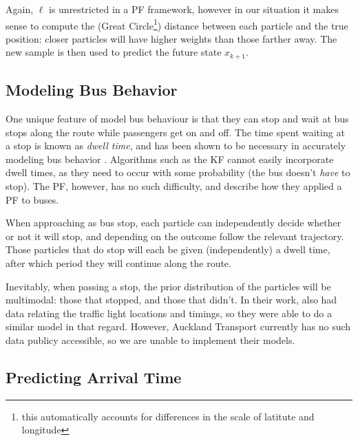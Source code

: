 \documentclass[12pt,a4paper]{article}
\begin{document}
Again, $\ell$ is unrestricted in a PF framework, however in our situation it makes sense to 
compute the (Great Circle\footnote{this automatically accounts for differences in the scale of latitute
and longitude}) 
distance between each particle and the true position:
closer particles will have higher weights than those farther away.
The new sample is then used to predict the future state $x_{k+1}$.





\subsection{Modeling Bus Behavior}
\label{sec:busbehavior}


One unique feature of model bus behaviour is that they can stop and wait at bus stops along the route
while passengers get on and off.
The time spent waiting at a stop is known as \emph{dwell time},
and has been shown to be necessary in accurately modeling bus behavior \citep{cn}.
Algorithms such as the KF cannot easily incorporate dwell times,
as they need to occur with some probability (the bus doesn't \emph{have} to stop).
The PF, however, has no such difficulty,
and \cite{hans-etal:2015} describe how they applied a PF to buses.


When approaching as bus stop,
each particle can independently decide whether or not it will stop,
and depending on the outcome follow the relevant trajectory.
Those particles that do stop will each be given (independently)
a dwell time, after which period they will continue along the route.

Inevitably, when passing a stop, the prior distribution of the particles will be multimodal:
those that stopped, and those that didn't.
In their work, \cite{hans-etal:2015} also had data relating the traffic light locations and
timings, so they were able to do a similar model in that regard.
However, Auckland Transport currently has no such data publicy accessible,
so we are unable to implement their models.



\subsection{Predicting Arrival Time}
\label{sec:arrivaltimeprediction}





\end{document}
